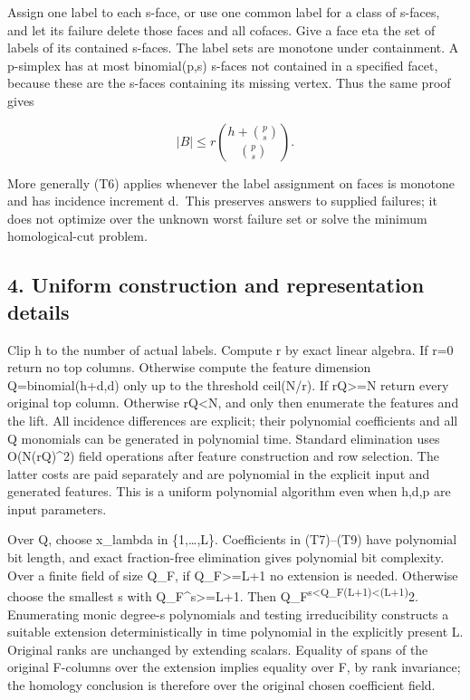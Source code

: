 Assign one label to each s-face, or use one common label for a class of s-faces, and let its failure delete those faces and all cofaces. Give a face eta the set of labels of its contained s-faces. The label sets are monotone under containment. A p-simplex has at most binomial(p,s) s-faces not contained in a specified facet, because these are the s-faces containing its missing vertex. Thus the same proof gives

\[
|B|\le r\binom{h+\binom{p}{s}}{\binom{p}{s}}.
 \tag{T14}
\]

More generally (T6) applies whenever the label assignment on faces is monotone and has incidence increment d.~This preserves answers to supplied failures; it does not optimize over the unknown worst failure set or solve the minimum homological-cut problem.

\hypertarget{af-3f6acd6e5b-uniform-construction-and-representation-details}{%
\subsection{4. Uniform construction and representation details}\label{af-3f6acd6e5b-uniform-construction-and-representation-details}}

Clip h to the number of actual labels. Compute r by exact linear algebra. If r=0 return no top columns. Otherwise compute the feature dimension Q=binomial(h+d,d) only up to the threshold ceil(N/r). If rQ\textgreater=N return every original top column. Otherwise rQ\textless N, and only then enumerate the features and the lift. All incidence differences are explicit; their polynomial coefficients and all Q monomials can be generated in polynomial time. Standard elimination uses O(N(rQ)\^{}2) field operations after feature construction and row selection. The latter costs are paid separately and are polynomial in the explicit input and generated features. This is a uniform polynomial algorithm even when h,d,p are input parameters.

Over Q, choose x\_lambda in \{1,\ldots,L\}. Coefficients in (T7)--(T9) have polynomial bit length, and exact fraction-free elimination gives polynomial bit complexity. Over a finite field of size Q\_F, if Q\_F\textgreater=L+1 no extension is needed. Otherwise choose the smallest s with Q\_F\^{}s\textgreater=L+1. Then Q\_F\textsuperscript{s\textless Q\_F(L+1)\textless(L+1)}2. Enumerating monic degree-s polynomials and testing irreducibility constructs a suitable extension deterministically in time polynomial in the explicitly present L. Original ranks are unchanged by extending scalars. Equality of spans of the original F-columns over the extension implies equality over F, by rank invariance; the homology conclusion is therefore over the original chosen coefficient field.

